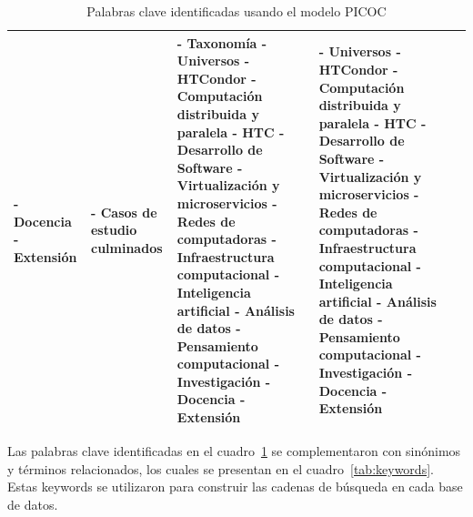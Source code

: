 \begin{table}[H]
\begin{tabular}{|p{2.8cm}|p{2.8cm}|p{2.0cm}|p{2.8cm}|p{2.8cm}|}
		- Docencia \newline
		- Extensión                   &
		- Casos de estudio culminados &
		- Taxonomía \newline
		- Universos \newline
		- HTCondor \newline
		- Computación distribuida y paralela \newline
		- HTC \newline
		- Desarrollo de Software \newline
		- Virtualización y microservicios \newline
		- Redes de computadoras \newline
		- Infraestructura computacional \newline
		- Inteligencia artificial \newline
		- Análisis de datos \newline
		- Pensamiento computacional \newline
		- Investigación \newline
		- Docencia \newline
		- Extensión                   &
		- Universos \newline
		- HTCondor \newline
		- Computación distribuida y paralela \newline
		- HTC \newline
		- Desarrollo de Software \newline
		- Virtualización y microservicios \newline
		- Redes de computadoras \newline
		- Infraestructura computacional \newline
		- Inteligencia artificial \newline
		- Análisis de datos \newline
		- Pensamiento computacional \newline
		- Investigación \newline
		- Docencia \newline
		- Extensión                                                                                                                     \\
		\hline
	\end{tabular}
	\caption{Palabras clave identificadas usando el modelo PICOC}
	\label{table:keywords-picoc}
\end{table}

Las palabras clave identificadas en el cuadro~\ref{table:keywords-picoc} se complementaron con sinónimos y términos relacionados, los cuales se presentan en el cuadro~\ref{tab:keywords}. Estas keywords se utilizaron para construir las cadenas de búsqueda en cada base de datos.



